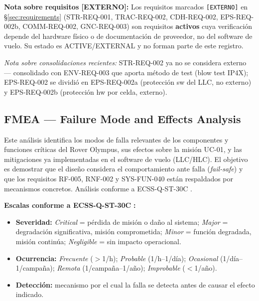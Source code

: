 \textbf{Nota sobre requisitos [EXTERNO]:} Los requisitos marcados \texttt{[EXTERNO]} en \S\ref{sec:requirements} (STR-REQ-001, TRAC-REQ-002, CDH-REQ-002, EPS-REQ-002b, COMM-REQ-002, GNC-REQ-003) son requisitos \textbf{activos} cuya verificación depende del hardware físico o de documentación de proveedor, no del software de vuelo. Su estado es ACTIVE/EXTERNAL y no forman parte de este registro.

\emph{Nota sobre consolidaciones recientes:} STR-REQ-002 ya no se considera externo --- consolidado con ENV-REQ-003 que aporta método de test (blow test IP4X); EPS-REQ-002 se dividió en EPS-REQ-002a (protección sw del LLC, no externo) y EPS-REQ-002b (protección hw por celda, externo).

\subsection{FMEA — Failure Mode and Effects Analysis}\label{subsec:fmea}

Este análisis identifica los modos de falla relevantes de los componentes y funciones críticas del Rover Olympus, sus efectos sobre la misión UC-01, y las mitigaciones ya implementadas en el software de vuelo (LLC/HLC). El objetivo es demostrar que el diseño considera el comportamiento ante falla (\textit{fail-safe}) y que los requisitos RF-005, RNF-002 y SYS-FUN-040 están respaldados por mecanismos concretos. Análisis conforme a ECSS-Q-ST-30C \cite{ecss_q_st_30}.

\textbf{Escalas conforme a ECSS-Q-ST-30C} \cite{ecss_q_st_30}\textbf{:}
\begin{itemize}
    \item \textbf{Severidad:} \textit{Critical} = pérdida de misión o daño al sistema; \textit{Major} = degradación significativa, misión comprometida; \textit{Minor} = función degradada, misión continúa; \textit{Negligible} = sin impacto operacional.
    \item \textbf{Ocurrencia:} \textit{Frecuente} ($>$1/h); \textit{Probable} (1/h–1/día); \textit{Ocasional} (1/día–1/campaña); \textit{Remota} (1/campaña–1/año); \textit{Improbable} ($<$1/año).
    \item \textbf{Detección:} mecanismo por el cual la falla se detecta antes de causar el efecto indicado.
\end{itemize}

